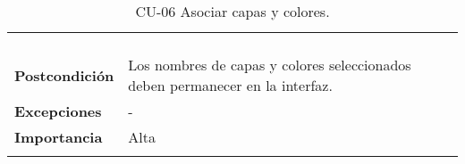 \begin{longtable}[H]{@{}ll@{}}
\begin{minipage}[t]{0.71\columnwidth}
\begin{enumerate}
\end{enumerate}\strut
\end{minipage}\tabularnewline
\begin{minipage}[t]{0.23\columnwidth}\raggedright\strut
\textbf{Postcondición}\strut
\end{minipage} & \begin{minipage}[t]{0.71\columnwidth}\raggedright\strut
  Los nombres de capas y colores seleccionados deben permanecer en la interfaz.
\end{minipage}\tabularnewline
\begin{minipage}[t]{0.23\columnwidth}\raggedright\strut
\textbf{Excepciones}\strut
\end{minipage} & \begin{minipage}[t]{0.71\columnwidth}\raggedright\strut
-\strut
\end{minipage}\tabularnewline
\begin{minipage}[t]{0.23\columnwidth}\raggedright\strut
\textbf{Importancia}\strut
\end{minipage} & \begin{minipage}[t]{0.71\columnwidth}\raggedright\strut
Alta\strut
\end{minipage}\tabularnewline
\bottomrule
\caption{CU-06 Asociar capas y colores.}
\end{longtable}
\strut
{}
\strut
